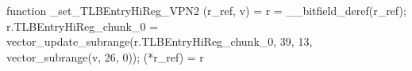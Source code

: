 function _set_TLBEntryHiReg_VPN2 (r_ref, v) = {
    r = __bitfield_deref(r_ref);
    r.TLBEntryHiReg_chunk_0 = vector_update_subrange(r.TLBEntryHiReg_chunk_0, 39, 13, vector_subrange(v, 26, 0));
    (*r_ref) = r
}
